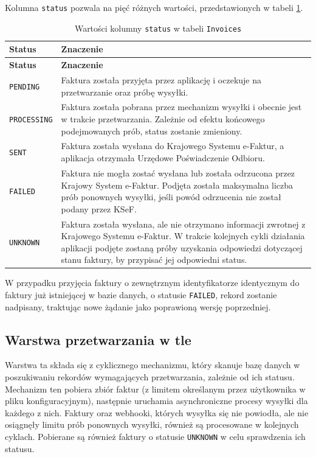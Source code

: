 Kolumna \texttt{status} pozwala na pięć różnych wartości, przedstawionych w tabeli \ref{tab:invoice_statuses}.
\begin{small}
\begin{longtable}{>{\raggedright\arraybackslash}p{3cm} >{\raggedright\arraybackslash}p{10cm}}
\caption{Wartości kolumny \texttt{status} w tabeli \texttt{Invoices}}
\label{tab:invoice_statuses} \\
\toprule
\textbf{Status} & \textbf{Znaczenie} \\
\midrule
\endfirsthead

\toprule
\textbf{Status} & \textbf{Znaczenie} \\
\midrule
\endhead

\bottomrule
\endfoot

\texttt{PENDING} & Faktura została przyjęta przez aplikację i oczekuje na przetwarzanie oraz próbę wysyłki. \\
\texttt{PROCESSING} & Faktura została pobrana przez mechanizm wysyłki i obecnie jest w trakcie przetwarzania. Zależnie od efektu końcowego podejmowanych prób, status zostanie zmieniony. \\
\texttt{SENT} & Faktura została wysłana do Krajowego Systemu e-Faktur, a aplikacja otrzymała Urzędowe Poświadczenie Odbioru. \\
\texttt{FAILED} & Faktura nie mogła zostać wysłana lub została odrzucona przez Krajowy System e-Faktur. Podjęta została maksymalna liczba prób ponownych wysyłki, jeśli powód odrzucenia nie został podany przez KSeF. \\
\texttt{UNKNOWN} & Faktura została wysłana, ale nie otrzymano informacji zwrotnej z Krajowego Systemu e-Faktur. W trakcie kolejnych cykli działania aplikacji podjęte zostaną próby uzyskania odpowiedzi dotyczącej stanu faktury, by przypisać jej odpowiedni status. \\
\end{longtable}
\end{small}

W przypadku przyjęcia faktury o zewnętrznym identyfikatorze identycznym do faktury już istniejącej w bazie danych, o statusie \texttt{FAILED}, rekord zostanie nadpisany, traktując nowe żądanie jako poprawioną wersję poprzedniej.

\subsection{Warstwa przetwarzania w tle}
Warstwa ta składa się z cyklicznego mechanizmu, który skanuje bazę danych w poszukiwaniu rekordów wymagających przetwarzania, zależnie od ich statusu. Mechanizm ten pobiera zbiór faktur (z limitem określanym przez użytkownika w pliku konfiguracyjnym), następnie uruchamia asynchroniczne procesy wysyłki dla każdego z nich. Faktury oraz webhooki, których wysyłka się nie powiodła, ale nie osiągnęły limitu prób ponownych wysyłki, również są procesowane w kolejnych cyklach. Pobierane są również faktury o statusie \texttt{UNKNOWN} w celu sprawdzenia ich statusu.

